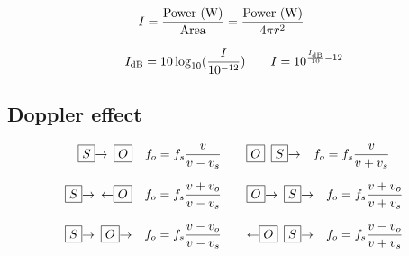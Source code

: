 \[
	I = \frac{\text{Power (\watt)}}{\text{Area}} = \frac{\text{Power (\watt)}}{4 \pi r^2} \qquad
\]

\[
	I_\decibel = 10 \log_{10} (\frac{I}{10^{-12}}) \qquad
	I = 10^{\frac{I_\decibel}{10} - 12}
\]

\subsection{Doppler effect}

\[
	\boxed{S}\smash{\rightarrow} \enspace \boxed{O} \quad f_o = f_s \frac{v}{v - v_s} \qquad
	\boxed{O} \enspace \boxed{S}\smash{\rightarrow} \quad f_o = f_s \frac{v}{v + v_s}
\]

\[
	\boxed{S}\smash{\rightarrow} \enspace \smash{\leftarrow}\boxed{O} \quad f_o = f_s \frac{v + v_o}{v - v_s} \qquad
	\boxed{O}\smash{\rightarrow} \enspace \boxed{S}\smash{\rightarrow} \quad f_o = f_s \frac{v + v_o}{v + v_s}
\]

\[
	\boxed{S}\smash{\rightarrow} \enspace \boxed{O}\smash{\rightarrow} \quad f_o = f_s \frac{v - v_o}{v - v_s} \qquad
	\smash{\leftarrow}\boxed{O} \enspace \boxed{S}\smash{\rightarrow} \quad f_o = f_s \frac{v - v_o}{v + v_s}
\]